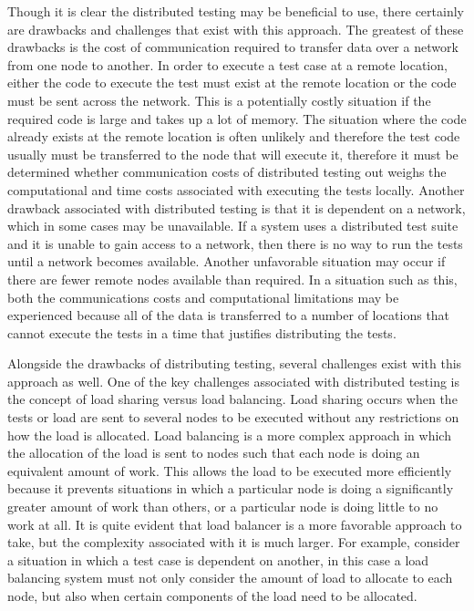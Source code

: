 \documentclass{article}
\begin{document}
{Though it is clear the distributed testing may be beneficial to use, there certainly are drawbacks and challenges that exist with this approach. The greatest of these drawbacks is the cost of communication required to transfer data over a network from one node to another. In order to execute a test case at a remote location, either the code to execute the test must exist at the remote location or the code must be sent across the network. This is a potentially costly situation if the required code is large and takes up a lot of memory. The situation where the code already exists at the remote location is often unlikely and therefore the test code usually must be transferred to the node that will execute it, therefore it must be determined whether communication costs of distributed testing out weighs the computational and time costs associated with executing the tests locally. Another drawback associated with distributed testing is that it is dependent on a network, which in some cases may be unavailable. If a system uses a distributed test suite and it is unable to gain access to a network, then there is no way to run the tests until a network becomes available. Another unfavorable situation may occur if there are fewer remote nodes available than required. In a situation such as this, both the communications costs and computational limitations may be experienced because all of the data is transferred to a number of locations that cannot execute the tests in a time that justifies distributing the tests.

Alongside the drawbacks of distributing testing, several challenges exist with this approach as well. One of the key challenges associated with distributed testing is the concept of load sharing versus load balancing. Load sharing occurs when the tests or load are sent to several nodes to be executed without any restrictions on how the load is allocated. Load balancing is a more complex approach in which the allocation of the load is sent to nodes such that each node is doing an equivalent amount of work. This allows the load to be executed more efficiently because it prevents situations in which a particular node is doing a significantly greater amount of work than others, or a particular node is doing little to no work at all. It is quite evident that load balancer is a more favorable approach to take, but the complexity associated with it is much larger. For example, consider a situation in which a test case is dependent on another, in this case a load balancing system must not only consider the amount of load to allocate to each node, but also when certain components of the load need to be allocated. 

}
\end{document}
